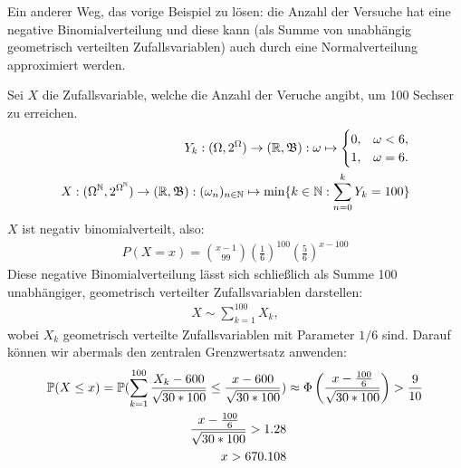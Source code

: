 \begin{exercise}

Ein anderer Weg, das vorige Beispiel zu lösen: die Anzahl der Versuche hat eine negative Binomialverteilung und diese kann (als Summe von unabhängig geometrisch verteilten Zufallsvariablen) auch durch eine Normalverteilung approximiert werden.

\end{exercise}

\begin{solution}

Sei $X$ die Zufallsvariable, welche die Anzahl der Veruche angibt, um 100 Sechser zu erreichen.
\begin{align*}
Y_k:(\Omega,2^\Omega) \to (\mathbb{R},\mathfrak{B}): \omega \mapsto
\begin{cases}
    0, & \omega < 6, \\
    1, & \omega = 6.
\end{cases} \\
    X:(\Omega^{\mathbb{N}},2^{\Omega^{\mathbb{N}}}) \to (\mathbb{R}, \mathfrak{B}): (\omega_n)_{n\in\mathbb{N}} \mapsto \min\{k\in\mathbb{N}: \sum_{n = 0}^kY_k = 100\}
\end{align*}
$X$ ist negativ binomialverteilt, also:
\begin{align*}
  P(X=x) = {x - 1\choose 99}(\frac{1}{6})^{100}(\frac{5}{6})^{x-100}
\end{align*}
Diese negative Binomialverteilung lässt sich schließlich als Summe 100 unabhängiger, geometrisch verteilter Zufallsvariablen darstellen:
\begin{align*}
  X \sim \sum_{k=1}^{100}X_k,
\end{align*}
wobei $X_k$ geometrisch verteilte Zufallsvariablen mit Parameter $1/6$ sind.
Darauf können wir abermals den zentralen Grenzwertsatz anwenden:
\begin{align*}
  \mathbb{P}(X \leq x) = \mathbb{P}(\sum_{k=1}^{100}\frac{X_k - 600}{\sqrt{30*100}} \leq \frac{x-600}{\sqrt{30*100}}) &\approx \Phi\left ( \frac{x-\frac{100}{6}}{\sqrt{30*100}} \right )  > \frac{9}{10} \\
  \frac{x-\frac{100}{6}}{\sqrt{30*100}} > 1.28 \\
  x > 670.108
\end{align*}
\end{solution}
